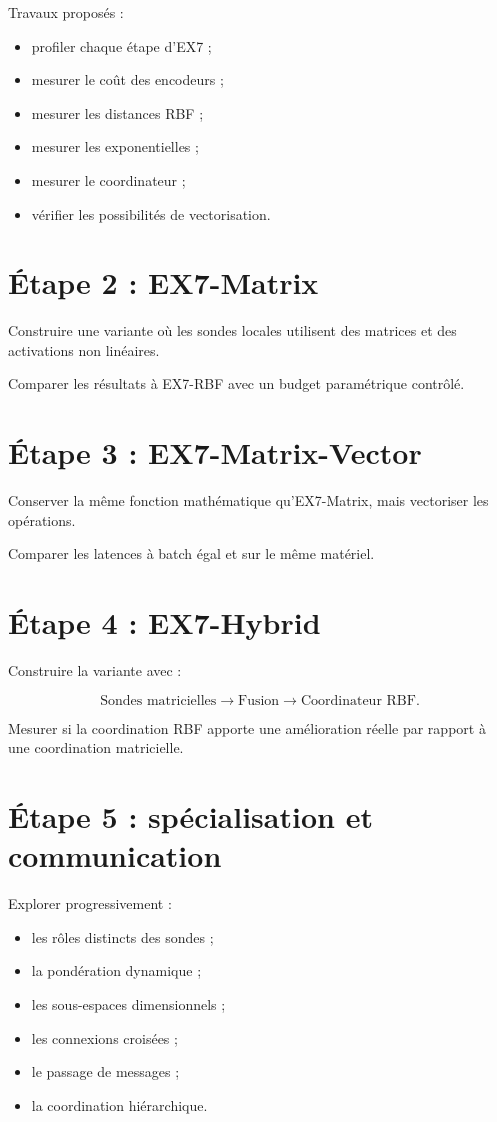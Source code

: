 \documentclass[11pt,a4paper]{report}
\begin{document}
Travaux proposés :

\begin{itemize}
  \item profiler chaque étape d'EX7 ;
  \item mesurer le coût des encodeurs ;
  \item mesurer les distances RBF ;
  \item mesurer les exponentielles ;
  \item mesurer le coordinateur ;
  \item vérifier les possibilités de vectorisation.
\end{itemize}

\section{Étape 2 : EX7-Matrix}

Construire une variante où les sondes locales utilisent
des matrices et des activations non linéaires.

Comparer les résultats à EX7-RBF avec un budget
paramétrique contrôlé.

\section{Étape 3 : EX7-Matrix-Vector}

Conserver la même fonction mathématique qu'EX7-Matrix,
mais vectoriser les opérations.

Comparer les latences à batch égal et sur le même matériel.

\section{Étape 4 : EX7-Hybrid}

Construire la variante avec :

\[
\text{Sondes matricielles}
\longrightarrow
\text{Fusion}
\longrightarrow
\text{Coordinateur RBF}.
\]

Mesurer si la coordination RBF apporte une amélioration
réelle par rapport à une coordination matricielle.

\section{Étape 5 : spécialisation et communication}

Explorer progressivement :

\begin{itemize}
  \item les rôles distincts des sondes ;
  \item la pondération dynamique ;
  \item les sous-espaces dimensionnels ;
  \item les connexions croisées ;
  \item le passage de messages ;
  \item la coordination hiérarchique.
\end{itemize}
\end{document}
